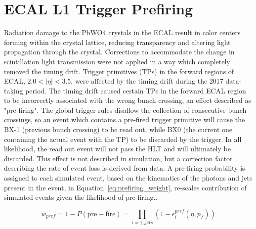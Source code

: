 \section{ECAL L1 Trigger Prefiring}\label{ch:prefire}
Radiation damage to the PbWO4 crystals in the ECAL result in color centers forming within the crystal lattice, reducing transparency and altering light propagation through the crystal. Corrections to accommodate the change in scintillation light transmission were not applied in a way which completely removed the timing drift. Trigger primitives (TPs) in the forward regions of ECAL, $2.0 < |\eta| < 3.5$, were affected by the timing drift during the 2017 data-taking period. The timing drift caused certain TPs in the forward ECAL region to be incorrectly associated with the wrong bunch crossing, an effect described as "pre-firing". The global trigger rules disallow the collection of consecutive bunch crossings, so an event which contains a pre-fired trigger primitive will cause the BX-1 (previous bunch crossing) to be read out, while BX0 (the current one containing the actual event with the TP) to be discarded by the trigger. In all likelihood, the read out event will not pass the HLT and will ultimately be discarded.
This effect is not described in simulation, but a correction factor describing the rate of event loss is derived from data. A pre-firing probability is assigned to each simulated event, based on the kinematics of the photons and jets present in the event, in Equation~\ref{eq:prefiring_weight}, re-scales contribution of simulated events given the likelihood of pre-firing..

\begin{equation}
    w_{pref} = 1 - P(\mathrm{pre-fire}) = \prod_{i=\gamma,jets}{(1 - \epsilon_i^{pref}(\eta,p_T))}
    \label{eq:prefiring_weight}
\end{equation}
